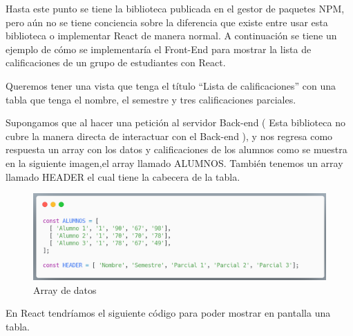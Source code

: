 
Hasta este punto se tiene la biblioteca publicada en el gestor de paquetes NPM, pero aún no se tiene conciencia sobre la diferencia que existe entre usar esta biblioteca o implementar React de manera normal.
A continuación se tiene un ejemplo de cómo se implementaría el Front-End para mostrar la lista de calificaciones de un grupo de estudiantes con React.

Queremos tener una vista que tenga el título “Lista de calificaciones” con una tabla que tenga el nombre, el semestre y tres calificaciones parciales. 

Supongamos que al hacer una petición al servidor Back-end ( Esta biblioteca no cubre la manera directa de interactuar con el Back-end ), y nos regresa como respuesta un array con los datos y calificaciones de los alumnos como se muestra en la siguiente imagen,el array llamado ALUMNOS. También tenemos un array llamado HEADER el cual tiene la cabecera de la tabla.

 \newline
     \begin{figure}[H]
    \includegraphics[width=1\textwidth]{./Imagenes/array.png}
     \caption[Crear nuevos directorios]{Array de datos}
         \end{figure}
    \newline

En React tendríamos el siguiente código para poder mostrar en pantalla una tabla.

